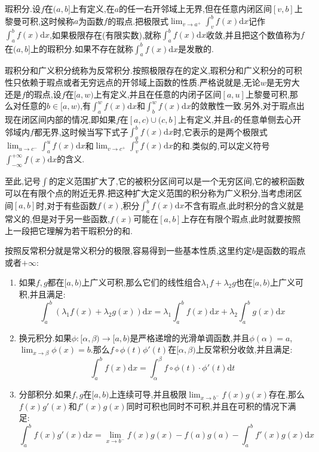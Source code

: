 瑕积分.设$f$在$(a,b]$上有定义,在$a$的任一右开邻域上无界,但在任意内闭区间$[v,b]$上黎曼可积,这时候称$a$为函数$f$的瑕点.把极限式$\lim_{v\to a^+}\int_v^bf(x)\mathrm{d}x$记作$\int_a^bf(x)\mathrm{d}x$,如果极限存在(有限实数),就称$\int_a^bf(x)\mathrm{d}x$收敛,并且把这个数值称为$f$在$(a,b]$上的瑕积分.如果不存在就称$\int_a^bf(x)\mathrm{d}x$是发散的.

瑕积分和广义积分统称为反常积分.按照极限存在的定义,瑕积分和广义积分的可积性只依赖于瑕点或者无穷远点的开邻域上函数的性质.严格说就是,无论$w$是无穷大还是$f$的瑕点,设$f$在$[a,w)$上有定义,并且在任意的内闭子区间$[a,u]$上黎曼可积,那么对任意的$b\in[a,w)$,有$\int_a^wf(x)\mathrm{d}x$和$\int_b^wf(x)\mathrm{d}x$的敛散性一致.另外,对于瑕点出现在闭区间内部的情况,即如果$f$在$[a,c)\cup(c,b]$上有定义,并且$c$的任意单侧去心开邻域内$f$都无界,这时候当写下式子$\int_a^bf(x)\mathrm{d}x$时,它表示的是两个极限式$\lim_{u\to c^-}\int_a^uf(x)\mathrm{d}x$和$\lim_{v\to c^+}\int_v^bf(x)\mathrm{d}x$的和.类似的,可以定义符号$\int_{-\infty}^{+\infty}f(x)\mathrm{d}x$的含义.

至此,记号$\int$的定义范围扩大了,它的被积分区间可以是一个无穷区间,它的被积函数可以在有限个点的附近无界.把这种扩大定义范围的积分称为广义积分,当考虑闭区间$[a,b]$时,对于有些函数$f(x)$,积分$\int_a^bf(x)\mathrm{d}x$不含有瑕点,此时积分的含义就是常义的,但是对于另一些函数,$f(x)$可能在$[a,b]$上存在有限个瑕点,此时就要按照上一段把它理解为若干瑕积分的和.

按照反常积分就是常义积分的极限,容易得到一些基本性质,这里约定$b$是函数的瑕点或者$+\infty$:
\begin{enumerate}
	\item 如果$f,g$都在$[a,b)$上广义可积,那么它们的线性组合$\lambda_1f+\lambda_2g$也在$[a,b)$上广义可积,并且满足:
	$$\int_a^b\left(\lambda_1f(x)+\lambda_2g(x)\right)\mathrm{d}x=\lambda_1\int_a^bf(x)\mathrm{d}x+\lambda_2\int_a^bg(x)\mathrm{d}x$$
	\item 换元积分.如果$\phi:[\alpha,\beta)\to[a,b)$是严格递增的光滑单调函数,并且$\phi(\alpha)=a$,$\lim_{x\to\beta}\phi(x)=b$.那么$f\circ\phi(t)\phi'(t)$在$[\alpha,\beta)$上反常积分收敛,并且满足:
	$$\int_a^bf(x)\mathrm{d}x=\int_{\alpha}^{\beta}f\circ\phi(t)\cdot\phi'(t)\mathrm{d}t$$
	\item 分部积分.如果$f,g$在$[a,b)$上连续可导,并且极限$\lim_{x\to b^-}f(x)g(x)$存在,那么$f(x)g'(x)$和$f'(x)g(x)$同时可积也同时不可积,并且在可积的情况下满足:
	$$\int_a^bf(x)g'(x)\mathrm{d}x=\lim_{x\to b^-}f(x)g(x)-f(a)g(a)-\int_a^bf'(x)g(x)\mathrm{d}x$$
\end{enumerate}

